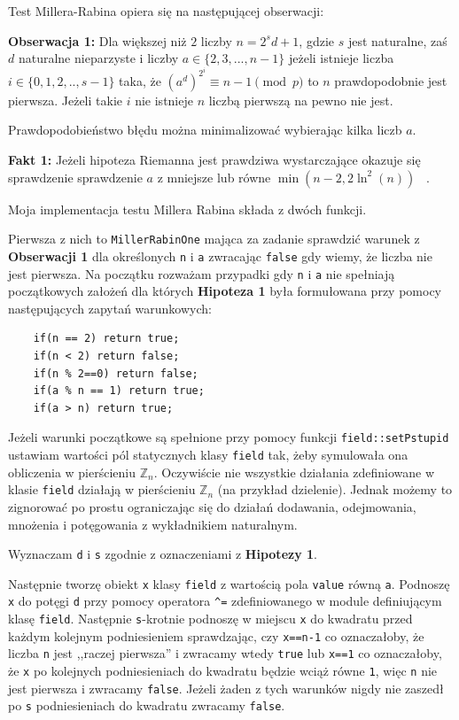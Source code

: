 \documentclass{article}
\begin{document}
Test Millera-Rabina opiera się na następującej obserwacji:
\begin{tcolorbox}
\textbf{Obserwacja 1:} Dla większej niż $2$ liczby $n=2^sd+1$, gdzie $s$ jest naturalne, zaś $d$ naturalne nieparzyste i liczby $
a \in \{2,3,...,n-1\}$
jeżeli istnieje liczba $i \in \{0,1,2,..,s-1\}$ taka, że $(a^d)^{2^i} \equiv n-1 \pmod p$ to $n$
prawdopodobnie jest pierwsza. Jeżeli takie $i$ nie istnieje $n$ liczbą pierwszą na pewno nie jest.
\end{tcolorbox}

Prawdopodobieństwo błędu można minimalizować wybierając kilka liczb $a$. 
\begin{tcolorbox}
    \textbf{Fakt 1:} Jeżeli hipoteza Riemanna jest 
    prawdziwa wystarczające okazuje się sprawdzenie sprawdzenie $a$ z mniejsze lub równe 
    $\min(n-2,2\ln^2(n))$ ~\cite{durnoga2017large}.
    
\end{tcolorbox}

Moja implementacja testu Millera Rabina składa z dwóch funkcji. 

Pierwsza z nich to \texttt{MillerRabinOne} mająca za zadanie sprawdzić warunek z \textbf{Obserwacji 1} dla określonych
\texttt{n} i \texttt{a} zwracając \texttt{false} gdy wiemy, że liczba nie jest pierwsza.
Na początku rozważam przypadki gdy \texttt{n} i \texttt{a} nie spełniają początkowych założeń dla których
\textbf{Hipoteza 1} była formułowana przy pomocy następujących zapytań warunkowych:
\begin{verbatim}
    if(n == 2) return true;
    if(n < 2) return false;
    if(n % 2==0) return false;
    if(a % n == 1) return true;
    if(a > n) return true;
\end{verbatim}

Jeżeli warunki początkowe są spełnione przy pomocy funkcji \texttt{field::setPstupid} ustawiam wartości pól statycznych klasy 
\texttt{field} tak, żeby symulowała
ona obliczenia w pierścieniu $\mathbb{Z}_n$. Oczywiście nie wszystkie działania zdefiniowane
w klasie \texttt{field} działają w pierścieniu $\mathbb{Z}_n$ (na przykład dzielenie). Jednak
możemy to zignorować po prostu ograniczając się do działań dodawania, odejmowania, mnożenia i potęgowania
z wykładnikiem naturalnym.

Wyznaczam \texttt{d} i \texttt{s} zgodnie z oznaczeniami z \textbf{Hipotezy 1}.

Następnie tworzę obiekt \texttt{x} klasy \texttt{field} z wartością pola \texttt{value} równą \texttt{a}.
Podnoszę \texttt{x} do potęgi \texttt{d} przy pomocy operatora \verb!^!\texttt{=} zdefiniowanego w module definiującym klasę \texttt{field}.
Następnie \texttt{s}-krotnie podnoszę w miejscu \texttt{x} do kwadratu przed każdym kolejnym podniesieniem sprawdzając, czy \texttt{x==n-1} 
co oznaczałoby, że liczba \texttt{n} jest ,,raczej pierwsza'' i zwracamy wtedy \texttt{true} lub \texttt{x==1} co oznaczałoby, że \texttt{x} po kolejnych podniesieniach do kwadratu
będzie wciąż równe \texttt{1}, więc \texttt{n} nie jest pierwsza i zwracamy \texttt{false}. Jeżeli żaden z tych warunków nigdy nie zaszedł 
po \texttt{s} podniesieniach do kwadratu zwracamy \texttt{false}.
\end{document}
